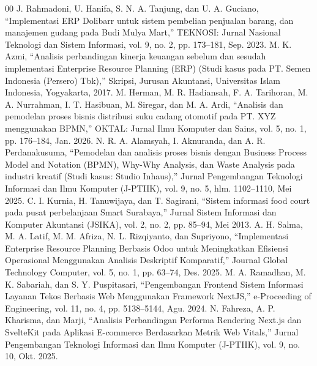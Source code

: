 \documentclass[conference]{IEEEtran}
\begin{document}
\begin{thebibliography}{00}
 J. Rahmadoni, U. Hanifa, S. N. A. Tanjung, dan U. A. Guciano, “Implementasi ERP Dolibarr untuk sistem pembelian penjualan barang, dan manajemen gudang pada Budi Mulya Mart,” TEKNOSI: Jurnal Nasional Teknologi dan Sistem Informasi, vol. 9, no. 2, pp. 173–181, Sep. 2023.
 M. K. Azmi, “Analisis perbandingan kinerja keuangan sebelum dan sesudah implementasi Enterprise Resource Planning (ERP) (Studi kasus pada PT. Semen Indonesia (Persero) Tbk),” Skripsi, Jurusan Akuntansi, Universitas Islam Indonesia, Yogyakarta, 2017.
 M. Herman, M. R. Hadiansah, F. A. Tarihoran, M. A. Nurrahman, I. T. Hasibuan, M. Siregar, dan M. A. Ardi, “Analisis dan pemodelan proses bisnis distribusi suku cadang otomotif pada PT. XYZ menggunakan BPMN,” OKTAL: Jurnal Ilmu Komputer dan Sains, vol. 5, no. 1, pp. 176–184, Jan. 2026.
 N. R. A. Alamsyah, I. Aknuranda, dan A. R. Perdanakusuma, “Pemodelan dan analisis proses bisnis dengan Business Process Model and Notation (BPMN), Why-Why Analysis, dan Waste Analysis pada industri kreatif (Studi kasus: Studio Inhaus),” Jurnal Pengembangan Teknologi Informasi dan Ilmu Komputer (J-PTIIK), vol. 9, no. 5, hlm. 1102–1110, Mei 2025.
 C. I. Kurnia, H. Tanuwijaya, dan T. Sagirani, “Sistem informasi food court pada pusat perbelanjaan Smart Surabaya,” Jurnal Sistem Informasi dan Komputer Akuntansi (JSIKA), vol. 2, no. 2, pp. 85–94, Mei 2013.
 A. H. Salma, M. A. Latif, M. M. Afriza, N. L. Rizqiyanto, dan Supriyono, “Implementasi Enterprise Resource Planning Berbasis Odoo untuk Meningkatkan Efisiensi Operasional Menggunakan Analisis Deskriptif Komparatif,” Journal Global Technology Computer, vol. 5, no. 1, pp. 63–74, Des. 2025.
 M. A. Ramadhan, M. K. Sabariah, dan S. Y. Puspitasari, “Pengembangan Frontend Sistem Informasi Layanan Tekos Berbasis Web Menggunakan Framework NextJS,” e-Proceeding of Engineering, vol. 11, no. 4, pp. 5138–5144, Agu. 2024.
 N. Fahreza, A. P. Kharisma, dan Marji, “Analisis Perbandingan Performa Rendering Next.js dan SvelteKit pada Aplikasi E-commerce Berdasarkan Metrik Web Vitals,” Jurnal Pengembangan Teknologi Informasi dan Ilmu Komputer (J-PTIIK), vol. 9, no. 10, Okt. 2025.

\end{thebibliography}
\vspace{12pt}
\end{document}
